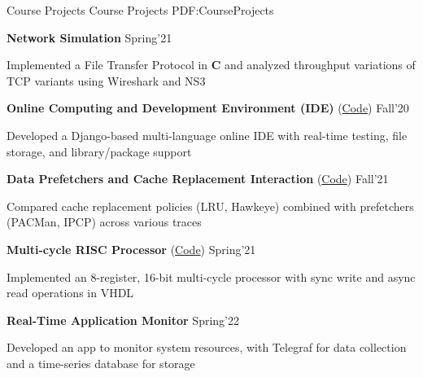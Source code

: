 
\Section
{Course Projects}
{Course Projects}
{PDF:CourseProjects}

\Entry
\textbf{Network Simulation} \hfill \footnotesize{Spring'21}
\begin{Detail}
    \Item Implemented a File Transfer Protocol in \textbf{C} and analyzed throughput variations of TCP variants using Wireshark and NS3
\end{Detail}

\Gap
\Entry
\textbf{Online Computing and Development Environment (IDE)} (\href{https://github.com/rajagond/OCD-E}{Code}) \hfill \footnotesize{Fall'20}
\begin{Detail}
\Item
Developed a Django-based multi-language online IDE with real-time testing, file storage, and library/package support
\end{Detail}

\Gap
\Entry
\textbf{Data Prefetchers and Cache Replacement Interaction} (\href{https://github.com/rajagond/ComputerArchitecture-TheMadlads}{Code}) \hfill \footnotesize{Fall'21}
\begin{Detail}
\Item
Compared cache replacement policies (LRU, Hawkeye) combined with prefetchers (PACMan, IPCP) across various traces
\end{Detail}

\Gap
\Entry
\textbf{Multi-cycle RISC Processor} (\href{https://github.com/rajagond/IITB-Proc}{Code}) \hfill \footnotesize{Spring'21}
\begin{Detail}
\Item
Implemented an 8-register, 16-bit multi-cycle processor with sync write and async read operations in VHDL
\end{Detail}

\Gap
\Entry 
\textbf{Real-Time Application Monitor} \hfill \footnotesize{Spring'22}
\begin{Detail}
\Item
Developed an app to monitor system resources, with Telegraf for data collection and a time-series database for storage
\end{Detail}